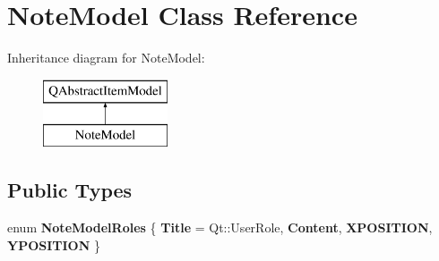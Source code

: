 \hypertarget{classNoteModel}{}\section{Note\+Model Class Reference}
\label{classNoteModel}
Inheritance diagram for Note\+Model\+:\begin{figure}[H]
\begin{center}
\leavevmode
\includegraphics[height=2.000000cm]{classNoteModel}
\end{center}
\end{figure}
\subsection*{Public Types}
\begin{DoxyCompactItemize}
\item 
\mbox{\label{classNoteModel_a77008f4402a891e33a05e4bd603d0fc3}} 
enum {\bfseries Note\+Model\+Roles} \{ {\bfseries Title} = Qt\+:\+:User\+Role, 
{\bfseries Content}, 
{\bfseries X\+P\+O\+S\+I\+T\+I\+ON}, 
{\bfseries Y\+P\+O\+S\+I\+T\+I\+ON}
 \}
\end{DoxyCompactItemize}
